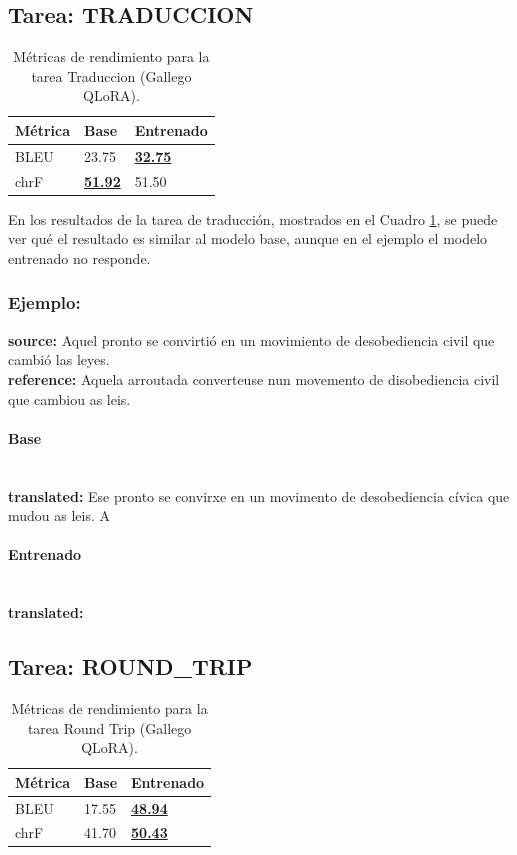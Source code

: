 \subsection{Tarea: TRADUCCION}\label{tarea-traduccion}
\begin{longtable}[]{@{}lll@{}}
\toprule\noalign{}
Métrica & Base & Entrenado \\
\midrule\noalign{}
\endhead
\bottomrule\noalign{}
\caption{Métricas de rendimiento para la tarea Traduccion (Gallego QLoRA).}
\label{tab:metricas_traduccion_Gallego QLoRA}
\endlastfoot
BLEU & 23.75 & \textbf{\underline{32.75}} \\
chrF & \textbf{\underline{51.92}} & 51.50 \\
\end{longtable}

En los resultados de la tarea de traducción, mostrados en el Cuadro \ref{tab:metricas_traduccion_Gallego QLoRA}, se puede ver qué el resultado es similar al modelo base, aunque en el ejemplo el modelo entrenado no responde.

\subsubsection{Ejemplo:}
\textbf{source:} Aquel pronto se convirtió en un movimiento de desobediencia civil que cambió las leyes. \\
\textbf{reference:} Aquela arroutada converteuse nun movemento de disobediencia civil que cambiou as leis. 

\paragraph{Base}~\\
\textbf{translated:} Ese pronto se convirxe en un movimento de desobediencia cívica que mudou as leis. A

\paragraph{Entrenado}~\\
\textbf{translated:} 

\subsection{Tarea: ROUND\_TRIP}\label{tarea-round_trip}
\begin{longtable}[]{@{}lll@{}}
\toprule\noalign{}
Métrica & Base & Entrenado \\
\midrule\noalign{}
\endhead
\bottomrule\noalign{}
\caption{Métricas de rendimiento para la tarea Round Trip (Gallego QLoRA).}
\label{tab:metricas_round_trip_Gallego QLoRA}
\endlastfoot
BLEU & 17.55 & \textbf{\underline{48.94}} \\
chrF & 41.70 & \textbf{\underline{50.43}} \\
\end{longtable}


